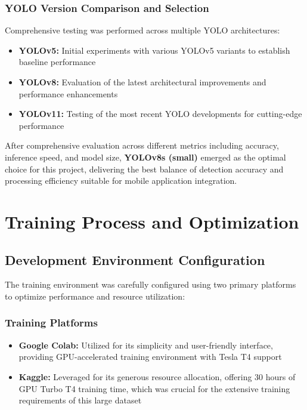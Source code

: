 \documentclass[12pt,a4paper]{report}
\begin{document}
\subsubsection{YOLO Version Comparison and Selection}

Comprehensive testing was performed across multiple YOLO architectures:

\begin{itemize}
    \item \textbf{YOLOv5:} Initial experiments with various YOLOv5 variants to establish baseline performance
    \item \textbf{YOLOv8:} Evaluation of the latest architectural improvements and performance enhancements
    \item \textbf{YOLOv11:} Testing of the most recent YOLO developments for cutting-edge performance
\end{itemize}

After comprehensive evaluation across different metrics including accuracy, inference speed, and model size, \textbf{YOLOv8s (small)} emerged as the optimal choice for this project, delivering the best balance of detection accuracy and processing efficiency suitable for mobile application integration.




\section{Training Process and Optimization}

\subsection{Development Environment Configuration}

The training environment was carefully configured using two primary platforms to optimize performance and resource utilization:

\subsubsection{Training Platforms}

\begin{itemize}
    \item \textbf{Google Colab:} Utilized for its simplicity and user-friendly interface, providing GPU-accelerated training environment with Tesla T4 support
    \item \textbf{Kaggle:} Leveraged for its generous resource allocation, offering 30 hours of GPU Turbo T4 training time, which was crucial for the extensive training requirements of this large dataset
\end{itemize}
\end{document}
